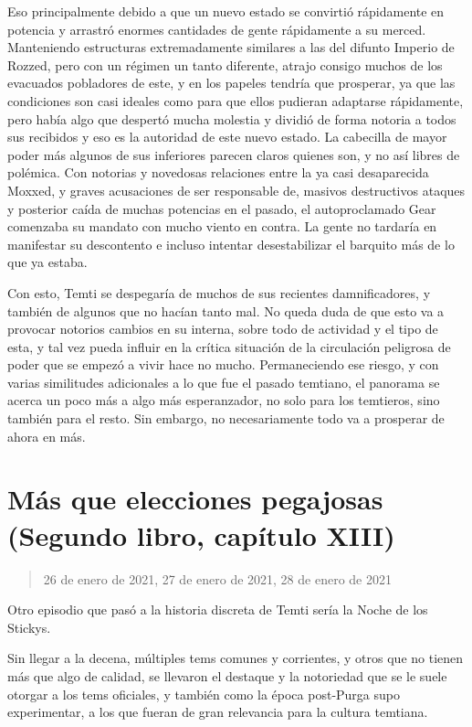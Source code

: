 \documentclass[
  spanish,
]{book}
\begin{document}
Eso principalmente debido a que un nuevo estado se convirtió rápidamente en potencia y arrastró enormes cantidades de gente rápidamente a su merced. Manteniendo estructuras extremadamente similares a las del difunto Imperio de Rozzed, pero con un régimen un tanto diferente, atrajo consigo muchos de los evacuados pobladores de este, y en los papeles tendría que prosperar, ya que las condiciones son casi ideales como para que ellos pudieran adaptarse rápidamente, pero había algo que despertó mucha molestia y dividió de forma notoria a todos sus recibidos y eso es la autoridad de este nuevo estado. La cabecilla de mayor poder más algunos de sus inferiores parecen claros quienes son, y no así libres de polémica. Con notorias y novedosas relaciones entre la ya casi desaparecida Moxxed, y graves acusaciones de ser responsable de, masivos destructivos ataques y posterior caída de muchas potencias en el pasado, el autoproclamado Gear comenzaba su mandato con mucho viento en contra. La gente no tardaría en manifestar su descontento e incluso intentar desestabilizar el barquito más de lo que ya estaba.

Con esto, Temti se despegaría de muchos de sus recientes damnificadores, y también de algunos que no hacían tanto mal. No queda duda de que esto va a provocar notorios cambios en su interna, sobre todo de actividad y el tipo de esta, y tal vez pueda influir en la crítica situación de la circulación peligrosa de poder que se empezó a vivir hace no mucho. Permaneciendo ese riesgo, y con varias similitudes adicionales a lo que fue el pasado temtiano, el panorama se acerca un poco más a algo más esperanzador, no solo para los temtieros, sino también para el resto. Sin embargo, no necesariamente todo va a prosperar de ahora en más.

\hypertarget{muxe1s-que-elecciones-pegajosas-segundo-libro-capuxedtulo-xiii}{%
\section{Más que elecciones pegajosas (Segundo libro, capítulo XIII)}\label{muxe1s-que-elecciones-pegajosas-segundo-libro-capuxedtulo-xiii}}

\begin{quote}
26 de enero de 2021, 27 de enero de 2021, 28 de enero de 2021
\end{quote}

Otro episodio que pasó a la historia discreta de Temti sería la Noche de los Stickys.

Sin llegar a la decena, múltiples tems comunes y corrientes, y otros que no tienen más que algo de calidad, se llevaron el destaque y la notoriedad que se le suele otorgar a los tems oficiales, y también como la época post-Purga supo experimentar, a los que fueran de gran relevancia para la cultura temtiana.
\end{document}

